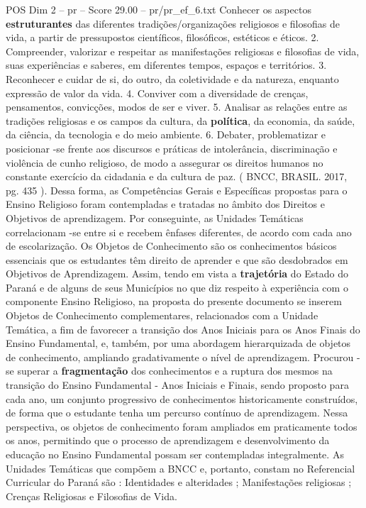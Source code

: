 \begin{textsample}{POS Dim 2 – pr – Score 29.00 – pr/pr\_ef\_6.txt}
Conhecer os aspectos \textbf{estruturantes} das diferentes tradições/organizações religiosos e filosofias de vida, a partir de pressupostos científicos, filosóficos, estéticos e éticos. 2.
Compreender, valorizar e respeitar as manifestações religiosas e filosofias de vida, suas experiências e saberes, em diferentes tempos, espaços e territórios. 3.
Reconhecer e cuidar de si, do outro, da coletividade e da natureza, enquanto expressão de valor da vida. 4.
Conviver com a diversidade de crenças, pensamentos, convicções, modos de ser e viver. 5.
Analisar as relações entre as tradições religiosas e os campos da cultura, da \textbf{política}, da economia, da saúde, da ciência, da tecnologia e do meio ambiente. 6.
Debater, problematizar e posicionar -se frente aos discursos e práticas de intolerância, discriminação e violência de cunho religioso, de modo a assegurar os direitos humanos no constante exercício da cidadania e da cultura de paz. ( BNCC, BRASIL. 2017, pg. 435 ).
Dessa forma, as Competências Gerais e Específicas propostas para o Ensino Religioso foram contempladas e tratadas no âmbito dos Direitos e Objetivos de aprendizagem.
Por conseguinte, as Unidades Temáticas correlacionam -se entre si e recebem ênfases diferentes, de acordo com cada ano de escolarização.
Os Objetos de Conhecimento são os conhecimentos básicos essenciais que os estudantes têm direito de aprender e que são desdobrados em Objetivos de Aprendizagem.
Assim, tendo em vista a \textbf{trajetória} do Estado do Paraná e de alguns de seus Municípios no que diz respeito à experiência com o componente Ensino Religioso, na proposta do presente documento se inserem Objetos de Conhecimento complementares, relacionados com a Unidade Temática, a fim de favorecer a transição dos Anos Iniciais para os Anos Finais do Ensino Fundamental, e, também, por uma abordagem hierarquizada de objetos de conhecimento, ampliando gradativamente o nível de aprendizagem.
Procurou -se superar a \textbf{fragmentação} dos conhecimentos e a ruptura dos mesmos na transição do Ensino Fundamental - Anos Iniciais e Finais, sendo proposto para cada ano, um conjunto progressivo de conhecimentos historicamente construídos, de forma que o estudante tenha um percurso contínuo de aprendizagem.
Nessa perspectiva, os objetos de conhecimento foram ampliados em praticamente todos os anos, permitindo que o processo de aprendizagem e desenvolvimento da educação no Ensino Fundamental possam ser contempladas integralmente.
As Unidades Temáticas que compõem a BNCC e, portanto, constam no Referencial Curricular do Paraná são : Identidades e alteridades ; Manifestações religiosas ; Crenças Religiosas e Filosofias de Vida.

\end{textsample}
